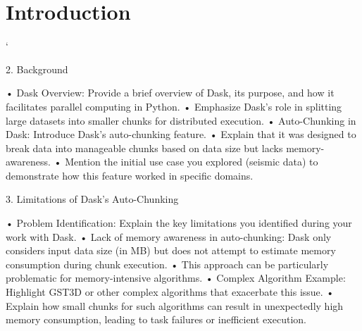 \chapter{Introduction}





`

2. Background

	•	Dask Overview: Provide a brief overview of Dask, its purpose, and how it facilitates parallel computing in Python.
	•	Emphasize Dask’s role in splitting large datasets into smaller chunks for distributed execution.
	•	Auto-Chunking in Dask: Introduce Dask’s auto-chunking feature.
	•	Explain that it was designed to break data into manageable chunks based on data size but lacks memory-awareness.
	•	Mention the initial use case you explored (seismic data) to demonstrate how this feature worked in specific domains.

3. Limitations of Dask’s Auto-Chunking

	•	Problem Identification: Explain the key limitations you identified during your work with Dask.
	•	Lack of memory awareness in auto-chunking: Dask only considers input data size (in MB) but does not attempt to estimate memory consumption during chunk execution.
	•	This approach can be particularly problematic for memory-intensive algorithms.
	•	Complex Algorithm Example: Highlight GST3D or other complex algorithms that exacerbate this issue.
	•	Explain how small chunks for such algorithms can result in unexpectedly high memory consumption, leading to task failures or inefficient execution.

